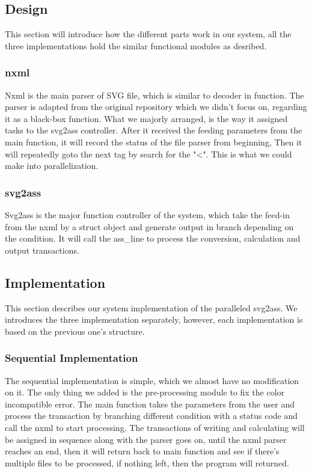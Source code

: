 \documentclass[10pt,twocolumn,letterpaper]{article}
\numberwithin{figure}{section}
\begin{document}
\subsection{Design}

This section will introduce how the different parts work in our system, all the three implementations hold the similar functional modules as desribed.

\subsubsection{nxml}

Nxml is the main parser of SVG file, which is similar to decoder in function. The parser is adapted from the original repository which we didn't focus on, regarding it as a black-box function. What we majorly arranged, is the way it assigned tasks to the svg2ass controller. After it received the feeding parameters from the main function, it will record the status of the file parser from beginning, Then it will repeatedly goto the next tag by search for the "<". This is what we could make into parallelization.

\subsubsection{svg2ass}

Svg2ass is the major function controller of the system, which take the feed-in from the nxml by a struct object and generate output in branch depending on the condition. It will call the ass\_line to process the conversion, calculation and output transactions.


\subsection{Implementation}

This section describes our system implementation of the paralleled svg2ass. We introduces the three implementation separately, however, each implementation is based on the previous one's structure.

\subsubsection{Sequential Implementation}

The sequential implementation is simple, which we almost have no modification on it. The only thing we added is the pre-processing module to fix the color incompatible error. The main function takes the parameters from the user and process the transaction by branching different condition with a status code and call the nxml to start processing. The transactions of writing and calculating will be assigned in sequence along with the parser goes on, until the nxml parser reaches an end, then it will return back to main function and see if there's multiple files to be processed, if nothing left, then the program will returned.
\end{document}
